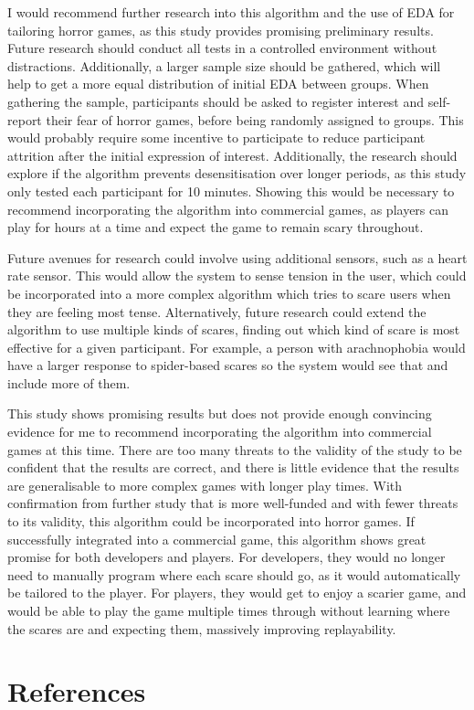 \documentclass[12pt,a4paper]{article}\usepackage[]{graphicx}\usepackage[]{color}
\begin{document}
I would recommend further research into this algorithm and the use of EDA for tailoring horror games, as this study provides promising preliminary results.
Future research should conduct all tests in a controlled environment without distractions.
Additionally, a larger sample size should be gathered, which will help to get a more equal distribution of initial EDA between groups.
When gathering the sample, participants should be asked to register interest and self-report their fear of horror games, before being randomly assigned to groups.
This would probably require some incentive to participate to reduce participant attrition after the initial expression of interest.
Additionally, the research should explore if the algorithm prevents desensitisation over longer periods, as this study only tested each participant for 10 minutes.
Showing this would be necessary to recommend incorporating the algorithm into commercial games, as players can play for hours at a time and expect the game to remain scary throughout.

Future avenues for research could involve using additional sensors, such as a heart rate sensor.
This would allow the system to sense tension in the user, which could be incorporated into a more complex algorithm which tries to scare users when they are feeling most tense.
Alternatively, future research could extend the algorithm to use multiple kinds of scares, finding out which kind of scare is most effective for a given participant.
For example, a person with arachnophobia would have a larger response to spider-based scares so the system would see that and include more of them.

This study shows promising results but does not provide enough convincing evidence for me to recommend incorporating the algorithm into commercial games at this time.
There are too many threats to the validity of the study to be confident that the results are correct, and there is little evidence that the results are generalisable to more complex games with longer play times.
With confirmation from further study that is more well-funded and with fewer threats to its validity, this algorithm could be incorporated into horror games.
If successfully integrated into a commercial game, this algorithm shows great promise for both developers and players.
For developers, they would no longer need to manually program where each scare should go, as it would automatically be tailored to the player.
For players, they would get to enjoy a scarier game, and would be able to play the game multiple times through without learning where the scares are and expecting them, massively improving replayability.


\section{References}
\footnotesize
\end{document}
